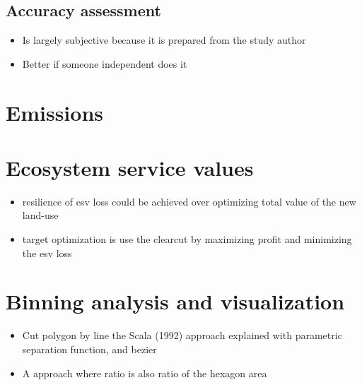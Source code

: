 		\subsection{Accuracy assessment}
		\label{subsec:discussion_accuracy_assessment}
			\begin{itemize}
				\item Is largely subjective because it is prepared from the study author
				\item Better if someone independent does it 
			\end{itemize}

	\section{Emissions}

	\section{Ecosystem service values}
		\begin{itemize}
			\item resilience of esv loss could be achieved over optimizing total value of the new land-use
			\item target optimization is use the clearcut by maximizing profit and minimizing the esv loss
		\end{itemize}

	\section{Binning analysis and visualization}
		\begin{itemize}
			\item Cut polygon by line the Scala (1992) approach explained with parametric separation function, and bezier
			\item A approach where ratio is also ratio of the hexagon area
		\end{itemize}

